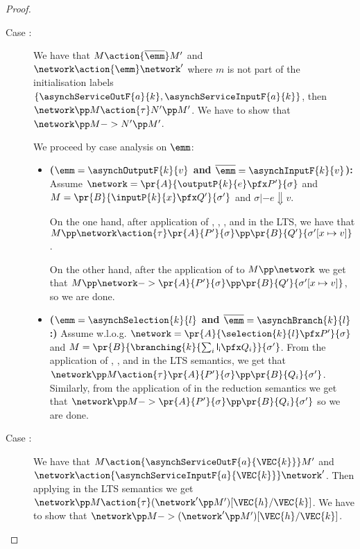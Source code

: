 \begin{proposition}
\begin{proof}
\begin{description}
 \begin{description}
   \item[Case :] We have that $M \action{\overline \emm} M'$
     and $\network \action{\emm} \network'$ where $m$ is not part of the
     initialisation labels $\{\asynchServiceOutF{a}{k},
     \asynchServiceInputF{a}{k} \}$, then $\network \pp M
     \action{\tau} N' \pp M'$. We have to show that $\network \pp M
     -> N' \pp M'$. 

     We proceed by case analysis on $\emm$:
     \begin{itemize}
       \item {\bf ($\emm = \asynchOutputF{k}{v}$ and $\overline{\emm} =
           \asynchInputF{k}{v}$):}
         Assume $\network  = \pr{A}{\outputP{k}{e} \pfx P'}{\sigma}$
         and $M = \pr{B}{\inputP{k}{x} \pfx Q'}{\sigma'}$ and $\sigma
         |- e\Downarrow v$.
         
         On the one hand, after application of ,
         , ,  and 
         in the LTS, we have that $M \pp \network \action{\tau}
         \pr{A}{P'}{\sigma} \pp \pr{B}{Q'}{\sigma'[x \mapsto v]}$.

         On the other hand, after the application of   to
         $M \pp \network$ we get that $M \pp \network ->
         \pr{A}{P'}{\sigma} \pp \pr{B}{Q'}{\sigma'[x \mapsto v]}$, so
         we are done.

         \item {\bf ($\emm = \asynchSelection{k}{l}$ and $\overline{\emm}
             = \asynchBranch{k}{l}$:)} 
           Assume w.l.o.g. $\network =
           \pr{A}{\selection{k}{l} \pfx P'}{\sigma}$ and $M =
           \pr{B}{\branching{k}{\sum_i \mathsf{l_i} \pfx
               Q_i}}{\sigma'}$. From the application of ,
           ,  and  in the LTS
           semantics, we get that $ \network \pp M \action{\tau}
           \pr{A}{P'}{\sigma} \pp \pr{B}{Q_i}{\sigma'}$.
           Similarly, from the application of  in the
           reduction semantics we get that $\network \pp M ->
           \pr{A}{P'}{\sigma} \pp \pr{B}{Q_i}{\sigma'}$ so we are done.
       \end{itemize}

       \item[Case :] We have that $M
         \action{\asynchServiceOutF{a}{\VEC{k}}} M'$ and $\network \action{\asynchServiceInputF{a}{\VEC{k}}}
         \network'$. Then applying  in the LTS semantics
         we get $\network \pp M \action{\tau} (\network' \pp
         M')[\VEC{h}/\VEC{k}]$. We have  to show that $\network \pp M -> (\network' \pp
         M')[\VEC{h}/\VEC{k}]$.


\end{description}
\end{description}
\end{proof}
\end{proposition}
